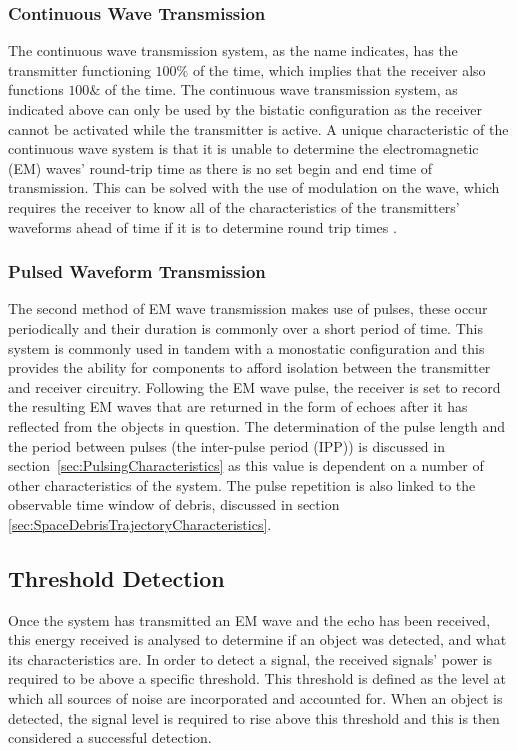 \documentclass[11pt]{witseiepaper}
\begin{document}
\begin{bibunit}[witseie]
\subsubsection{Continuous Wave Transmission} \label{sec:ContinuousWaveTransmission}

The continuous wave transmission system, as the name indicates, has the transmitter functioning $100\%$ of the time, which implies that the receiver also functions $100 \&$ of the time. The continuous wave transmission system, as indicated above can only be used by the bistatic configuration as the receiver cannot be activated while the transmitter is active.
A unique characteristic of the continuous wave system is that it is unable to determine the electromagnetic (EM) waves' round-trip time as there is no set begin and end time of transmission. This can be solved with the use of modulation on the wave, which requires the receiver to know all of the characteristics of the transmitters' waveforms ahead of time if it is to determine round trip times \cite[p.~20]{radarHandbook}.

\subsubsection{Pulsed Waveform Transmission} \label{sec:PulsedWaveformTransmission}

The second method of EM wave transmission makes use of pulses, these occur periodically and their duration is commonly over a short period of time. This system is commonly used in tandem with a monostatic configuration and this provides the ability for components to afford isolation between the transmitter and receiver circuitry.
Following the EM wave pulse, the receiver is set to record the resulting EM waves that are returned in the form of echoes after it has reflected from the objects in question. The determination of the pulse length and the period between pulses (the inter-pulse period (IPP)) is discussed in section~\ref{sec:PulsingCharacteristics} as this value is dependent on a number of other characteristics of the system. The pulse repetition is also linked to the observable time window of debris, discussed in section \ref{sec:SpaceDebrisTrajectoryCharacteristics}.


\subsection{Threshold Detection} \label{sec:ThresholdDetection}
Once the system has transmitted an EM wave and the echo has been received, this energy received is analysed to determine if an object was detected, and what its characteristics are.
In order to detect a signal, the received signals' power is required to be above a specific threshold. This threshold is defined as the level at which all sources of noise are incorporated and accounted for. When an object is detected, the signal level is required to rise above this threshold and this is then considered a successful detection.


\end{bibunit}
\end{document}
